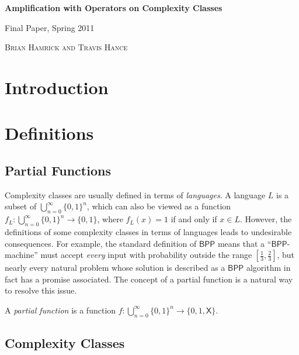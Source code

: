 \documentclass[11pt]{article}
\newcommand{\bpp}{\textsf{BPP}}
\newcommand{\x}{\textsf{X}}
\begin{document}
\begin{center} \begin{LARGE} {\sc \bf Amplification with Operators on Complexity Classes} \vspace{6pt}

{ Final Paper, Spring 2011} \vspace{9pt}

\end{LARGE} { \Large \textsc{Brian Hamrick and Travis Hance}}

\end{center}

\section{Introduction}

\section{Definitions}

\subsection{Partial Functions}

Complexity classes are usually defined in terms of \emph{languages}. A language $L$ is a subset of $\bigcup_{n=0}^{\infty}\{0,1\}^n$, which can also be viewed as a function $f_L: \bigcup_{n=0}^{\infty}\{0,1\}^n \to \{0,1\}$, where $f_L(x) = 1$ if and only if $x \in L$. However, the definitions of some complexity classes in terms of languages leads to undesirable consequences. For example, the standard definition of $\bpp$ means that a ``$\bpp$-machine'' must accept \emph{every} input with probability outside the range $[\frac{1}{3},\frac{2}{3}]$, but nearly every natural problem whose solution is described as a $\bpp$ algorithm in fact has a promise associated. The concept of a partial function is a natural way to resolve this issue.

\begin{definition}\label{partialfunction}
A \emph{partial function} is a function $f: \bigcup_{n=0}^{\infty}\{0,1\}^n \to \{0,1,\x\}$.
\end{definition}

\subsection{Complexity Classes}
\end{document}
